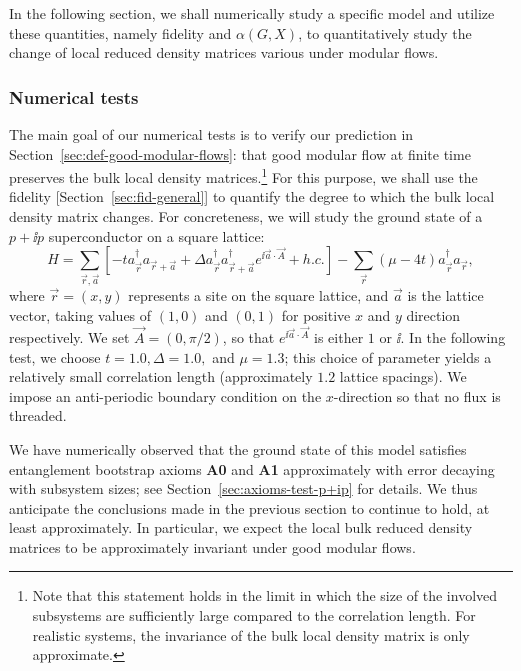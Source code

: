 \documentclass[12pt, nofootinbib]{article}
\theoremstyle{plain}
\theoremstyle{assumption}
\theoremstyle{definition}
\theoremstyle{plain}
\theoremstyle{plain}
\theoremstyle{plain}
\theoremstyle{plain}
\theoremstyle{plain}
\begin{document}
In the following section, we shall numerically study a specific model and utilize these quantities, namely fidelity and $\alpha(G,X)$, to quantitatively study the change of local reduced density matrices various under modular flows. 

 
\subsubsection{Numerical tests}

The main goal of our numerical tests is to verify our prediction in Section~\ref{sec:def-good-modular-flows}: that good modular flow at finite time preserves the bulk local density matrices.\footnote{Note that this statement holds in the limit in which the size of the involved subsystems are sufficiently large compared to the correlation length. For realistic systems, the invariance of the bulk local density matrix is only approximate.} For this purpose, we shall use the fidelity [Section~\ref{sec:fid-general}] to quantify the degree to which the bulk local density matrix changes. For concreteness, we will study the ground state of a $p+\ii p$ superconductor on a square lattice:
\begin{equation}\label{eq:pipH-2}
    H = \sum_{\vec{r},\vec{a}} \left[ -ta_{\vec{r}}^{\dagger}a_{\vec{r}+\vec{a}} + \Delta a_{\vec{r}}^{\dagger}a_{\vec{r}+\vec{a}}^{\dagger} e^{\ii \vec{a}\cdot \vec{A}}  + h.c. \right] - \sum_{\vec{r}}(\mu - 4t)a_{\vec{r}}^{\dagger}a_{\vec{r}}, 
\end{equation}
where $\vec{r} = (x,y)$ represents a site on the square lattice, and $\vec{a}$ is the lattice vector, taking values of $(1,0)$ and $(0,1)$ for positive $x$ and $y$ direction respectively.  
We set $\vec{A} = (0,\pi/2)$, so that $e^{\ii \vec{a}\cdot \vec{A}}$ is either $1$ or $\ii$. 
In the following test, we choose $t = 1.0,\Delta=1.0,$ and $\mu = 1.3$; this choice of parameter yields a relatively small correlation length (approximately $1.2$ lattice spacings). We impose an anti-periodic boundary condition on the $x$-direction so that no flux is threaded. 

We have numerically observed that the ground state of this model satisfies entanglement bootstrap axioms {\bf A0} and {\bf A1} approximately with error decaying with subsystem sizes; see Section~\ref{sec:axioms-test-p+ip} for details. We thus anticipate the conclusions made in the previous section to continue to hold, at least approximately. In particular, we expect the local bulk reduced density matrices to be approximately invariant under good modular flows.
\end{document}

